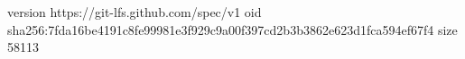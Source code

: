 version https://git-lfs.github.com/spec/v1
oid sha256:7fda16be4191c8fe99981e3f929c9a00f397cd2b3b3862e623d1fca594ef67f4
size 58113

